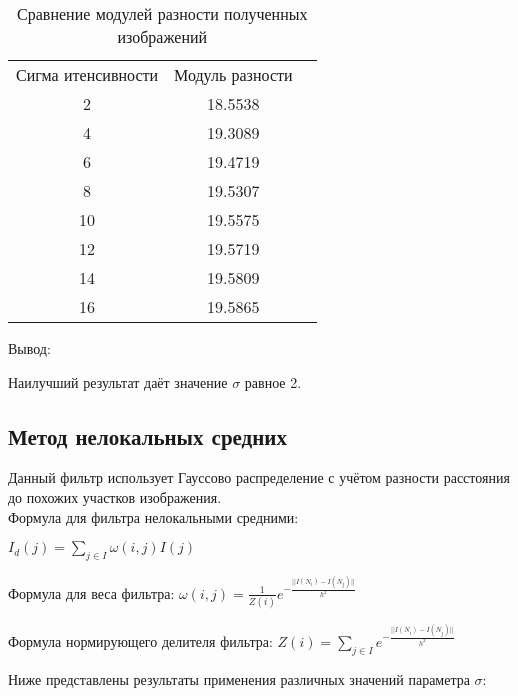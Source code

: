 \begin{table}[H]
	\caption{Сравнение модулей разности полученных изображений}
	\label{tabular:timesandtenses}
	\begin{center}
		\begin{tabular}{ccc}
			Сигма итенсивности & Модуль разности \\
			2 & 18.5538 \\
			4 & 19.3089 \\
			6 & 19.4719 \\
			8 & 19.5307 \\
			10 & 19.5575 \\
			12 & 19.5719 \\
			14 & 19.5809 \\
			16 & 19.5865 \\
		\end{tabular}
	\end{center}
\end{table}

Вывод:

Наилучший результат даёт значение $\sigma$ равное 2. 

\subsection{Метод нелокальных средних}

Данный фильтр использует Гауссово распределение с учётом разности расстояния до похожих участков изображения.\\

Формула для фильтра нелокальными средними:

$I_d(j) = \sum\limits_{j \in I} \omega (i,j) I(j)$

Формула для веса фильтра:
$\omega(i,j) = \frac{1}{Z(i)} e^{- \frac{||I(N_i)-I(N_j)||}{h^2}}$

Формула нормирующего делителя фильтра:
$Z(i) = \sum\limits_{j \in I} e^{- \frac{||I(N_i)-I(N_j)||}{h^2}}$

Ниже представлены результаты применения различных значений параметра $\sigma$:

